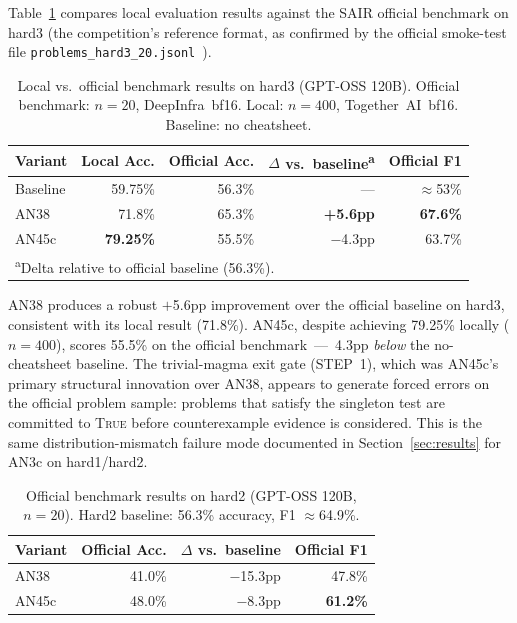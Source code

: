 \documentclass[11pt]{article}
\begin{document}
Table~\ref{tab:official_hard3} compares local evaluation results
against the SAIR official benchmark on hard3 (the competition's
reference format, as confirmed by the official smoke-test file
\texttt{problems\_hard3\_20.jsonl}~\citep{sair2026judge}).

\begin{table}[h]
\centering
\caption{Local vs.\ official benchmark results on hard3 (GPT-OSS 120B).
Official benchmark: $n=20$, DeepInfra~bf16. Local: $n=400$,
Together~AI~bf16. Baseline: no cheatsheet.}
\label{tab:official_hard3}
\small
\begin{tabular}{lrrrr}
\toprule
Variant & Local Acc. & Official Acc. & $\Delta$ vs.\ baseline\textsuperscript{a} & Official F1 \\
\midrule
Baseline & 59.75\% & 56.3\% & --- & $\approx$53\% \\
AN38     & 71.8\%  & 65.3\% & \textbf{+5.6pp} & \textbf{67.6\%} \\
AN45c    & \textbf{79.25\%} & 55.5\% & $-$4.3pp & 63.7\% \\
\bottomrule
\multicolumn{5}{l}{\textsuperscript{a}Delta relative to official baseline (56.3\%).}
\end{tabular}
\end{table}

AN38 produces a robust $+$5.6pp improvement over the official baseline
on hard3, consistent with its local result (71.8\%). AN45c, despite
achieving 79.25\% locally ($n=400$), scores 55.5\% on the official
benchmark~---~4.3pp \emph{below} the no-cheatsheet baseline. The
trivial-magma exit gate (STEP~1), which was AN45c's primary structural
innovation over AN38, appears to generate forced errors on the official
problem sample: problems that satisfy the singleton test are committed to
\textsc{True} before counterexample evidence is considered. This is the
same distribution-mismatch failure mode documented in Section~\ref{sec:results}
for AN3c on hard1/hard2.

\begin{table}[h]
\centering
\caption{Official benchmark results on hard2 (GPT-OSS 120B, $n=20$).
Hard2 baseline: 56.3\% accuracy, F1 $\approx$64.9\%.}
\label{tab:official_hard2}
\small
\begin{tabular}{lrrr}
\toprule
Variant & Official Acc. & $\Delta$ vs.\ baseline & Official F1 \\
\midrule
AN38  & 41.0\% & $-$15.3pp & 47.8\% \\
AN45c & 48.0\% & $-$8.3pp  & \textbf{61.2\%} \\
\bottomrule
\end{tabular}
\end{table}
\end{document}
